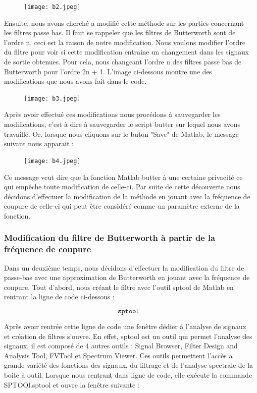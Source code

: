 \documentclass[conference,onecolumn]{IEEEtran}
\begin{document}
 \begin{figure}[H]
 \centering
    \texttt{[image: b2.jpeg]}
\end{figure}


Ensuite, nous avons cherché a modifié cette méthode sur les parties concernant les filtres passe bas. Il faut se rappeler que les filtres de Butterworth sont de l’ordre n, ceci est la raison de notre modification. Nous voulons modifier l’ordre du filtre pour voir si cette modification entraine un changement dans les signaux de sortie obtenues. Pour cela, nous changeant l’ordre n des filtres passe bas de Butterworth pour l’ordre 2n + 1. L’image ci-dessous montre une des modifications que nous avons fait dans le code.

 \begin{figure}[H]
 \centering
    \texttt{[image: b3.jpeg]}
\end{figure}


Après avoir effectué ces modifications nous procédons à sauvegarder les modifications, c'est à dire à sauvegarder le script butter sur lequel nous avons travaillé. Or, lorsque nous cliquons sur le buton "Save" de Matlab, le message suivant nous apparait :

 \begin{figure}[H]
 \centering
    \texttt{[image: b4.jpeg]}
\end{figure}


Ce message veut dire que la fonction Matlab butter à une certaine privacité ce qui empêche toute modification de celle-ci. Par suite de cette découverte nous décidons d’effectuer la modification de la méthode en jouant avec la fréquence de coupure de celle-ci qui peut être considéré comme un paramètre externe de la fonction.

\subsubsection{Modification du filtre de Butterworth à partir de la fréquence de coupure}
Dans un deuxième temps, nous décidons d'effectuer la modification du filtre de passe-bas avec une approximation de Butterworth en jouant avec la fréquence de coupure. Tout d'abord, nous créant le filtre avec l'outil sptool de Matlab en rentrant la ligne de code ci-dessous :

\[\texttt{sptool}\]

Après avoir rentrée cette ligne de code une fenêtre dédier à l'analyse de signaux et création de filtres s'ouvre. En effet, sptool est un outil qui permet l'analyse des signaux, il est composé de 4 autres outils : Signal Browser, Filter Design and Analysis Tool, FVTool et Spectrum Viewer. Ces outils permettent l'accès a grande variété des fonctions des signaux, du filtrage et de l'analyse spectrale de la boite à outil. Lorsque nous rentrant dans ligne de code, elle exécute la commande SPTOOl.sptool et ouvre la fenêtre suivante :
\end{document}
